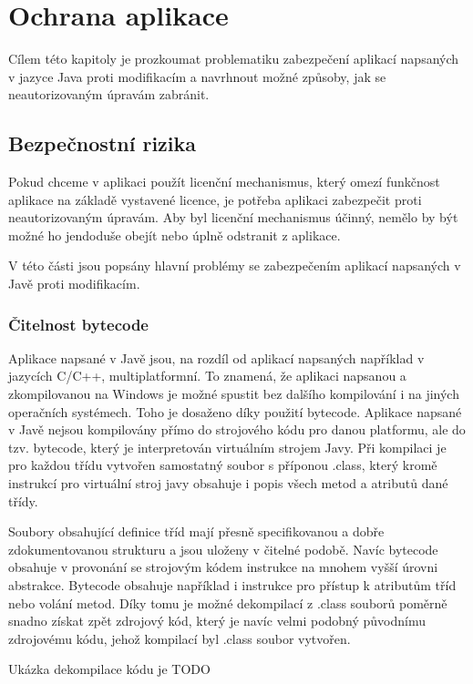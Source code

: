 \chapter{Ochrana aplikace}

Cílem této kapitoly je prozkoumat problematiku zabezpečení aplikací napsaných v
jazyce Java proti modifikacím a navrhnout možné způsoby, jak se neautorizovaným
úpravám zabránit.

\section{Bezpečnostní rizika}

Pokud chceme v aplikaci použít licenční mechanismus, který omezí funkčnost
aplikace na základě vystavené licence, je potřeba aplikaci zabezpečit proti
neautorizovaným úpravám. Aby byl licenční mechanismus účinný, nemělo by být
možné ho jendoduše obejít nebo úplně odstranit z aplikace.

V této části jsou popsány hlavní problémy se zabezpečením aplikací napsaných v
Javě proti modifikacím.

\subsection{Čitelnost bytecode}

Aplikace napsané v Javě jsou, na rozdíl od aplikací napsaných například v
jazycích C/C++, multiplatformní. To znamená, že aplikaci napsanou a
zkompilovanou na Windows je možné spustit bez dalšího kompilování i na jiných
operačních systémech. Toho je dosaženo díky použití bytecode. Aplikace napsané v
Javě nejsou kompilovány přímo do strojového kódu pro danou platformu, ale do
tzv. bytecode, který je interpretován virtuálním strojem Javy. Při kompilaci je
pro každou třídu vytvořen samostatný soubor s příponou .class, který kromě
instrukcí pro virtuální stroj javy obsahuje i popis všech metod a atributů dané
třídy.

Soubory obsahující definice tříd mají přesně specifikovanou a dobře
zdokumentovanou strukturu a jsou uloženy v čitelné podobě. Navíc bytecode
obsahuje v provonání se strojovým kódem instrukce na mnohem vyšší úrovni
abstrakce. Bytecode obsahuje například i instrukce pro přístup k atributům tříd
nebo volání metod. Díky tomu je možné dekompilací z .class souborů poměrně
snadno získat zpět zdrojový kód, který je navíc velmi podobný původnímu
zdrojovému kódu, jehož kompilací byl .class soubor vytvořen.

Ukázka dekompilace kódu je TODO




